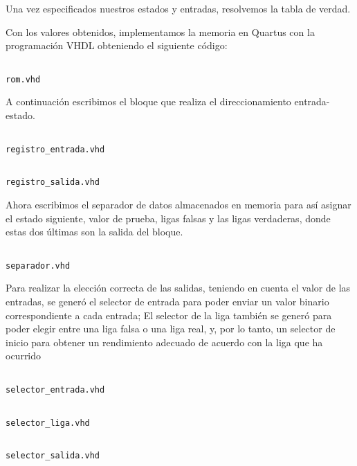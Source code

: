 \documentclass[table]{scrartcl}
\newenvironment{code}{\captionsetup{type=listing}}{}
\begin{document}
Una vez especificados nuestros estados y entradas, resolvemos la tabla de
verdad.
\begin{center}
  \label{tab:3}
  \scriptsize
  
\end{center}
Con los valores obtenidos, implementamos la memoria en Quartus con la
programación VHDL obteniendo el siguiente código:
\begin{code}
  \inputminted{vhdl}{./rom.vhd}
  \caption{\texttt{rom.vhd}}
\end{code}
A continuación escribimos el bloque que realiza el direccionamiento
entrada-estado.
\begin{code}
  \inputminted{vhdl}{./registro_entrada.vhd}
  \caption{\texttt{registro_entrada.vhd}}
\end{code}
\begin{code}
  \inputminted{vhdl}{./registro_salida.vhd}
  \caption{\texttt{registro_salida.vhd}}
\end{code}
Ahora escribimos el separador de datos almacenados en memoria para así
asignar el estado siguiente, valor de prueba, ligas falsas y las ligas
verdaderas, donde estas dos últimas son la salida del bloque.
\begin{code}
  \inputminted{vhdl}{./separador.vhd}
  \caption{\texttt{separador.vhd}}
\end{code}
Para realizar la elección correcta de las salidas, teniendo en cuenta el valor
de las entradas, se generó el selector de entrada para poder enviar un valor
binario correspondiente a cada entrada; El selector de la liga también se
generó para poder elegir entre una liga falsa o una liga real, y, por lo tanto, un
selector de inicio para obtener un rendimiento adecuado de acuerdo con la
liga que ha ocurrido
\begin{code}
  \inputminted{vhdl}{./selector_entrada.vhd}
  \caption{\texttt{selector_entrada.vhd}}
\end{code}
\begin{code}
  \inputminted{vhdl}{./selector_liga.vhd}
  \caption{\texttt{selector_liga.vhd}}
\end{code}
\begin{code}
  \inputminted{vhdl}{./selector_salida.vhd}
  \caption{\texttt{selector_salida.vhd}}
\end{code}
\newpage{}
\end{document}
